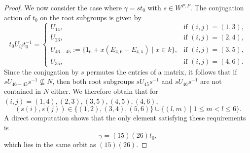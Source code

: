 \documentclass[12pt]{amsart}
\theoremstyle{Theorem}
\theoremstyle{Theorem}
\theoremstyle{Theorem}
\theoremstyle{Theorem}
\theoremstyle{Plain}
\theoremstyle{remark}
\theoremstyle{remark}
\theoremstyle{Definition}
\begin{document}
\begin{proof}
    We now consider the case where $ \gamma = s t_0 $ with $ s \in W^{P, P} $. The conjugation action of $t_0$ on the root subgroups is given by
    \[
        t_0 U_{ij} t_0^{-1} =
        \begin{cases}
            U_{14},                                                          & \text{if } (i,j) = (1,3),\\
            U_{23},                                                          & \text{if } (i,j) = (2,4),\\
            U_{46-45} := \{ 1_6 + x ( E_{4, 6} - E_{4, 5} ) \mid x \in k \}, & \text{if } (i,j) = (3,5),\\
            U_{35},                                                          & \text{if } (i,j) = (4,6).
        \end{cases}
    \]
    Since the conjugation by $s$ permutes the entries of a matrix, it follows that if $ s U_{46-45} s^{-1} \nsubseteq N $, then both root subgroups $ s U_{45} s^{-1} $ and $ s U_{46} s^{-1} $ are not contained in $N$ either. We therefore obtain that for $ (i,j) = (1,4), (2,3), (3,5), (4,5), (4,6) $,
    \[
        ( s(i), s(j) ) \in \{ (1,2), (3,4), (5,6) \} \cup \{ (l, m) \mid 1 \le m < l \le 6 \}.
    \]
    A direct computation shows that the only element satisfying these requirements is
    \[
        \gamma = (15)(26) t_0,
    \]
    which lies in the same orbit as $(15)(26)$. 
\end{proof}
\end{document}
